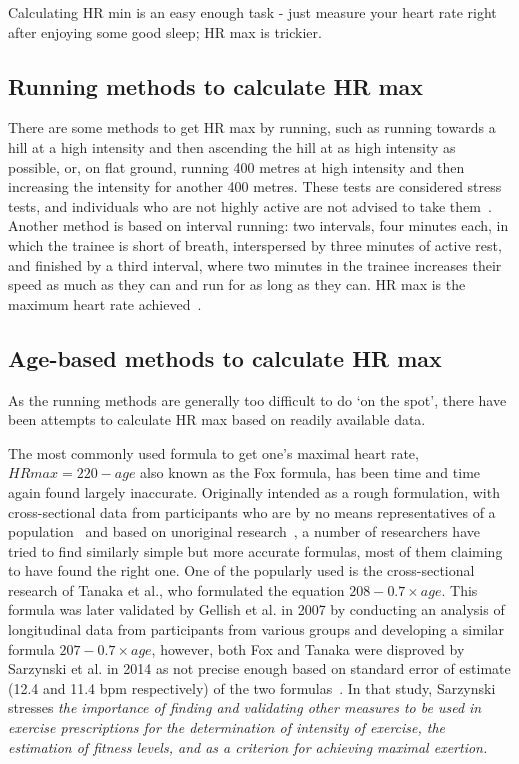Calculating HR min is an easy enough task - just measure your heart rate right after enjoying some good sleep; HR max is trickier.

\subsection*{Running methods to calculate HR max}
There are some methods to get HR max by running, such as running towards a hill at a high intensity and then ascending the hill at as high intensity as possible,
or, on flat ground, running 400 metres at high intensity and then increasing the intensity for another 400 metres.
These tests are considered stress tests, and individuals who are not highly active are not advised to take them~\cite{hrmax-running-tests}.
Another method is based on interval running:
two intervals, four minutes each, in which the trainee is short of breath, interspersed by three minutes of active rest, and finished by a third interval, where two minutes in the trainee increases their speed as much as they can and run for as long as they can.
HR max is the maximum heart rate achieved~\cite{hrmax-running-tests-intervals}.

\subsection*{Age-based methods to calculate HR max}
As the running methods are generally too difficult to do `on the spot', there have been attempts to calculate HR max based on readily available data.

The most commonly used formula to get one's maximal heart rate, $HRmax=220-age$ also known as the Fox formula, has been time and time again found largely inaccurate.
Originally intended as a rough formulation, with cross-sectional data from participants who are by no means representatives of a population~\cite{220-hrmax-new-formula} and based on unoriginal research~\cite{220-hrmax-disproved},
a number of researchers have tried to find similarly simple but more accurate formulas, most of them claiming to have found the right one.
One of the popularly used is the cross-sectional research of Tanaka et al., who formulated the equation $208-0.7\times age$.
This formula was later validated by Gellish et al. in 2007 by conducting an analysis of longitudinal data from participants from various groups and developing a similar formula $207-0.7\times age$,
however, both Fox and Tanaka were disproved by Sarzynski et al. in 2014 as not precise enough based on standard error of estimate (12.4 and 11.4 bpm respectively) of the two formulas~\cite{hrmax-age-disproved}.
In that study, Sarzynski stresses \textit{the importance of finding and validating other measures to be used in exercise prescriptions for the determination of intensity of exercise, the estimation of fitness levels, and as a criterion for achieving maximal exertion.}

